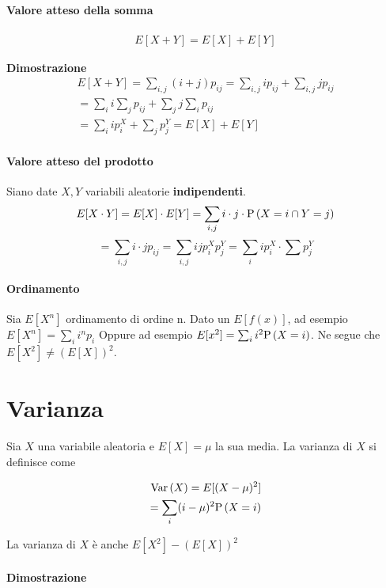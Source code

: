 \paragraph{Valore atteso della somma}

\[ \begin{aligned}
	E[X+Y] = E[X] + E[Y]
\end{aligned} \]

\textbf{Dimostrazione}
\[ 
\begin{aligned}
E[X+Y] = \sum_{i,j} (i+j)p_{ij} = \sum_{i,j} ip_{ij} + \sum_{i,j} jp_{ij} \\
= \sum_i i \sum_j p_{ij} + \sum_j j \sum_i p_{ij} \\
= \sum_i i p_i^X + \sum_j p_j^Y = E[X] + E[Y]
\end{aligned}
 \]


\paragraph{Valore atteso del prodotto}
Siano date $ X,Y $ variabili aleatorie \textbf{indipendenti}.
\[ E[X \cdot Y] = E[X] \cdot E[Y] = \sum_{i,j} i \cdot j \cdot \text{P}\left(X = i \cap Y =j\right)\]
\[ = \sum_{i,j} i \cdot j p_{ij} = \sum_{i,j} ij p_i^X p_j^Y =  \sum_{i} i p_i^X \cdot \sum p_j^Y\]

\paragraph{Ordinamento}

Sia $E[X^n]$ ordinamento di ordine n.
Dato un $ E[f(x)] $, ad esempio $ E[X^n] = \sum_i i^n p_i$
Oppure ad esempio $ E[x^2] = \sum_i i^2 \text{P}\left(X = i\right)$. Ne segue che $ E[X^2] \neq \left(E[X]\right)^2$.

\section{Varianza}

Sia $ X $ una variabile aleatoria e $ E[X] = \mu $ la sua media.
La varianza di $ X $ si definisce come 

\[ \begin{aligned}
\text{Var}\left(X\right) = E[(X-\mu)^2] \\ 
= \sum_i (i-\mu)^2 \text{P}\left(X = i\right)
\end{aligned}  \]

La varianza di $ X $ è anche $ E[X^2] - \left(E[X]\right)^2 $

\paragraph{Dimostrazione}

